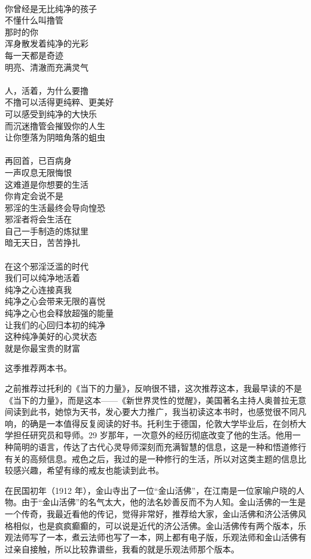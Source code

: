 \begin{poem}[永恒纯净]
    \begin{multicols}{3}
        \centering~\\
        你曾经是无比纯净的孩子 \\ 不懂什么叫撸管 \\ 那时的你 \\ 浑身散发着纯净的光彩 \\ 每一天都是奇迹 \\ 明亮、清澈而充满灵气 \\~\\
        人，活着，为什么要撸 \\ 不撸可以活得更纯粹、更美好 \\ 可以感受到纯净的大快乐 \\ 而沉迷撸管会摧毁你的人生 \\ 让你堕落为阴暗角落的蛆虫 \\~\\
        再回首，已百病身 \\ 一声叹息无限悔恨 \\ 这难道是你想要的生活 \\ 你肯定会说不是 \\ 邪淫的生活最终会导向惶恐 \\ 邪淫者将会生活在 \\ 自己一手制造的炼狱里 \\ 暗无天日，苦苦挣扎 \\~\\
        在这个邪淫泛滥的时代 \\ 我们可以纯净地活着 \\ 纯净之心连接真我 \\ 纯净之心会带来无限的喜悦 \\ 纯净之心也会释放超强的能量 \\ 让我们的心回归本初的纯净 \\ 这种纯净美好的心灵状态 \\ 就是你最宝贵的财富
    \end{multicols}
\end{poem}

这季推荐两本书。

\begin{book}[《新世界灵性的觉醒》]
    之前推荐过托利的《当下的力量》，反响很不错，这次推荐这本，我最早读的不是《当下的力量》，而是这本——《新世界灵性的觉醒》，美国著名主持人奥普拉无意间读到此书，她惊为天书，发心要大力推广，我当初读这本书时，也感觉很不同凡响，的确是一本值得反复阅读的好书。托利生于德国，伦敦大学毕业后，在剑桥大学担任研究员和导师。29 岁那年，一次意外的经历彻底改变了他的生活。他用一种简明的语言，传达了古代心灵导师深刻而充满智慧的信息，这是一种和悟道修行有关的高频信息。戒色之后，我过的是一种修行的生活，所以对这类主题的信息比较感兴趣，希望有缘的戒友也能读到此书。
\end{book}

\begin{book}
    在民国初年（1912 年），金山寺出了一位“金山活佛”，在江南是一位家喻户晓的人物。由于“金山活佛”的名气太大，他的法名妙善反而不为人知。金山活佛的一生是一个传奇，我最近看他的传记，觉得非常好，推荐给大家，金山活佛和济公活佛风格相似，也是疯疯癫癫的，可以说是近代的济公活佛。金山活佛传有两个版本，乐观法师写了一本，煮云法师也写了一本，网上都有电子版，乐观法师和金山活佛有过亲自接触，所以比较靠谱些，我看的就是乐观法师那个版本。
\end{book}
